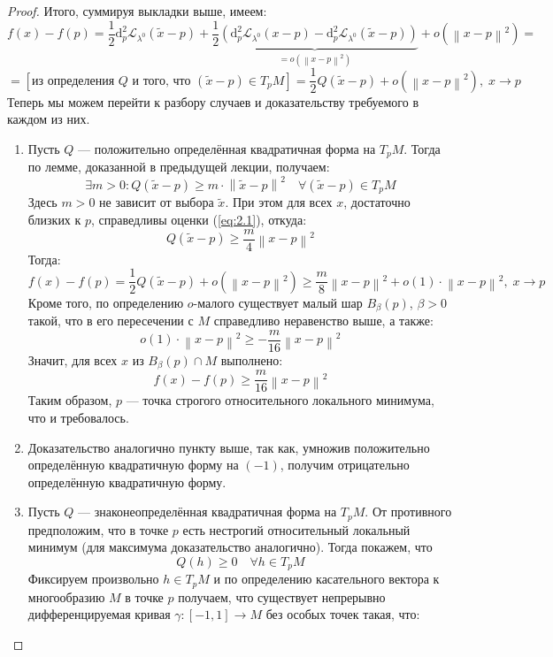 \documentclass[11pt]{article}
\begin{document}
\begin{proof}
    Итого, суммируя выкладки выше, имеем:
    \[f(x) - f(p) = \frac{1}{2} \mathrm{d}^2_p \mathcal{L}_{\lambda^0} (\widetilde{x} - p) + \underbrace{\frac{1}{2} (\mathrm{d}^2_p \mathcal{L}_{\lambda^0} (x - p) - \mathrm{d}^2_p \mathcal{L}_{\lambda^0} (\widetilde{x} - p))}_{= o \left(\left\lVert x - p \right\rVert^2\right)} +  o \left(\left\lVert x - p \right\rVert^2\right) = \]
    \[= [\text{из определения } Q \text{ и того, что } (\widetilde{x} - p) \in T_p M] = \frac{1}{2} Q (\widetilde{x} - p) + o \left(\left\lVert x - p \right\rVert^2\right), \; x \to p\]
    Теперь мы можем перейти к разбору случаев и доказательству требуемого в каждом из них.
    \begin{enumerate}
        \item Пусть $Q$ --- положительно определённая квадратичная форма на $T_p M$. Тогда по лемме, доказанной в предыдущей лекции, получаем:
        \[\exists m > 0: Q(\widetilde{x} - p) \geq m \cdot \left\lVert \widetilde{x} - p \right\rVert^2 \quad \forall (\widetilde{x} - p) \in T_p M\]
        Здесь $m > 0$ не зависит от выбора $\widetilde{x}$. При этом для всех $x$, достаточно близких к $p$, справедливы оценки (\ref{eq:2.1}), откуда:
        \[Q(\widetilde{x} - p) \geq \frac{m}{4} \left\lVert x - p \right\rVert^2\]
        Тогда:
        \[f(x) - f(p) = \frac{1}{2} Q (\widetilde{x} - p) + o \left(\left\lVert x - p \right\rVert^2\right) \geq \frac{m}{8} \left\lVert x - p \right\rVert^2 + o (1) \cdot \left\lVert x - p \right\rVert^2, \; x \to p\]
        Кроме того, по определению $o$-малого существует малый шар $B_{\beta} (p)$, $\beta > 0$ такой, что в его пересечении с $M$ справедливо неравенство выше, а также:
        \[o (1) \cdot \left\lVert x - p \right\rVert^2 \geq - \frac{m}{16} \left\lVert x - p \right\rVert^2\]
        Значит, для всех $x$ из $B_{\beta} (p) \cap M$ выполнено:
        \[f(x) - f(p) \geq \frac{m}{16} \left\lVert x - p \right\rVert^2\]
        Таким образом, $p$ --- точка строгого относительного локального минимума, что и требовалось.
        \item Доказательство аналогично пункту выше, так как, умножив положительно определённую квадратичную форму на $(-1)$, получим отрицательно определённую квадратичную форму.
        \item Пусть $Q$ --- знаконеопределённая квадратичная форма на $T_p M$. От противного предположим, что в точке $p$ есть нестрогий относительный локальный минимум (для максимума доказательство аналогично). Тогда покажем, что 
        \[Q (h) \geq 0 \quad  \forall h \in T_p M\]
        Фиксируем произвольно $h \in T_p M$ и по определению касательного вектора к многообразию $M$ в точке $p$ получаем, что существует непрерывно дифференцируемая кривая $\gamma \colon [-1, 1] \to M$ без особых точек такая, что:

\end{enumerate}
\end{proof}
\end{document}
